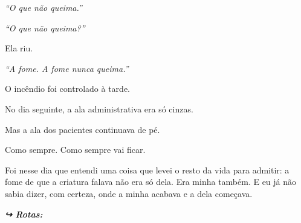 \noindent \textit{\textquotedblleft{}O que não queima.\textquotedblright{}}

\noindent \textit{\textquotedblleft{}O que não queima?\textquotedblright{}}

\noindent Ela riu.

\noindent \textit{\textquotedblleft{}A fome. A fome nunca queima.\textquotedblright{}}

\noindent O incêndio foi controlado à tarde.

\noindent No dia seguinte, a ala administrativa era só cinzas.

\noindent Mas a ala dos pacientes continuava de pé.

\noindent Como sempre.
Como sempre vai ficar.

\noindent Foi nesse dia que entendi uma coisa que levei o resto da vida para admitir: a fome de que a criatura falava não era só dela. Era minha também. E eu já não sabia dizer, com certeza, onde a minha acabava e a dela começava.

\vspace{0.5em}
\noindent\textit{\textbf{↪ Rotas:}  \rotasep {}}